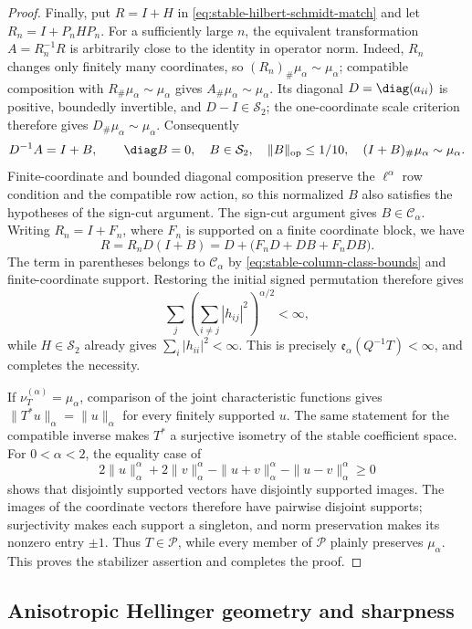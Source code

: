 \begin{proof}
Finally, put \(R=I+H\) in
\eqref{eq:stable-hilbert-schmidt-match} and let
\(R_n=I+P_nHP_n\).
For a sufficiently large \(n\), the equivalent transformation
\(A=R_n^{-1}R\) is arbitrarily close to the identity in operator norm.
Indeed, \(R_n\) changes only finitely many coordinates, so
\((R_n)_\#\mu_\alpha\sim\mu_\alpha\); compatible composition with
\(R_\#\mu_\alpha\sim\mu_\alpha\) gives
\(A_\#\mu_\alpha\sim\mu_\alpha\).
Its diagonal \(D=\diag(a_{ii})\) is positive, boundedly invertible, and
\(D-I\in\mathcal S_2\); the one-coordinate scale criterion therefore gives
\(D_\#\mu_\alpha\sim\mu_\alpha\).
Consequently
\[
 D^{-1}A=I+B,
 \qquad
 \diag B=0,\quad B\in\mathcal S_2,\quad
 \|B\|_{\mathrm{op}}\le1/10,\quad
 (I+B)_\#\mu_\alpha\sim\mu_\alpha.
\]
Finite-coordinate and bounded diagonal composition preserve the
\(\ell^\alpha\) row condition and the compatible row action, so this
normalized \(B\) also satisfies the hypotheses of the sign-cut argument.
The sign-cut argument gives \(B\in\mathcal C_\alpha\).
Writing \(R_n=I+F_n\), where \(F_n\) is supported on a finite coordinate
block, we have
\[
 R=R_nD(I+B)
  =D+\bigl(F_nD+DB+F_nDB\bigr).
\]
The term in parentheses belongs to \(\mathcal C_\alpha\) by
\eqref{eq:stable-column-class-bounds} and finite-coordinate support.
Restoring the initial signed permutation therefore gives
\[
 \sum_j\left(\sum_{i\ne j}|h_{ij}|^2\right)^{\alpha/2}<\infty,
\]
while \(H\in\mathcal S_2\) already gives
\(\sum_i|h_{ii}|^2<\infty\).
This is precisely \(\mathfrak e_\alpha(Q^{-1}T)<\infty\), and completes
the necessity.

If \(\nu_T^{(\alpha)}=\mu_\alpha\), comparison of the joint characteristic
functions gives
\(\|T^*u\|_\alpha=\|u\|_\alpha\) for every finitely supported \(u\).
The same statement for the compatible inverse makes \(T^*\) a surjective
isometry of the stable coefficient space.
For \(0<\alpha<2\), the equality case of
\[
 2\|u\|_\alpha^\alpha+2\|v\|_\alpha^\alpha
 -\|u+v\|_\alpha^\alpha-\|u-v\|_\alpha^\alpha\ge0
\]
shows that disjointly supported vectors have disjointly supported images.
The images of the coordinate vectors therefore have pairwise disjoint
supports; surjectivity makes each support a singleton, and norm preservation
makes its nonzero entry \(\pm1\).
Thus \(T\in\mathcal P\), while every member of \(\mathcal P\) plainly
preserves \(\mu_\alpha\).  This proves the stabilizer assertion and completes
the proof.
\end{proof}

\subsection{Anisotropic Hellinger geometry and sharpness}
\label{sec:stable-hellinger-geometry}

